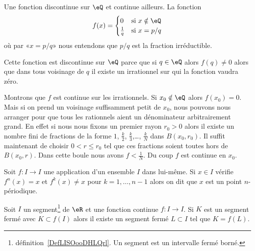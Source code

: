 \begin{example}
	Une fonction discontinue sur \( \eQ\) et continue ailleurs. La fonction
	\begin{equation}
		f(x)=\begin{cases}
			0             & \text{si } x\notin \eQ \\
			\frac{1}{ q } & \text{si } x=p/q
		\end{cases}
	\end{equation}
	où par «\( x=p/q\)» nous entendons que \( p/q\) est la fraction irréductible.

	Cette fonction est discontinue sur \( \eQ\) parce que si \( q\in \eQ\) alors \( f(q)\neq 0\) alors que dans tous voisinage de \( q\) il existe un irrationnel sur qui la fonction vaudra zéro.

	Montrons que \( f\) est continue sur les irrationnels. Si \( x_0\notin \eQ\) alors \( f(x_0)=0\). Mais si on prend un voisinage suffisamment petit de \( x_0\), nous pouvons nous arranger pour que tous les rationnels aient un dénominateur arbitrairement grand. En effet si nous nous fixons un premier rayon \( r_0>0\) alors il existe un nombre fini de fractions de la forme \( 1\), \( \frac{ k }{2}\), \( \frac{ k }{ 3 }\),\ldots, \( \frac{ k }{ N }\) dans \( B(x_0,r_0)\). Il suffit maintenant de choisir \( 0<r\leq r_0\) tel que ces fractions soient toutes hors de \( B(x_0,r)\). Dans cette boule nous avons \( f<\frac{1}{ N }\). Du coup \( f\) est continue en \( x_0\).
\end{example}

\begin{definition}
	Soit \( f\colon I\to I\) une application d'un ensemble \( I\) dans lui-même. Si \( x\in I\) vérifie \( f^n(x)=x\) et \( f^k(x)\neq x\) pour \( k=1,\ldots, n-1\) alors on dit que \( x\) est un point \( n\)-périodique.
\end{definition}

\begin{lemma}       \label{LemAONBooGZBuYt}
	Soit \( I\) un segment\footnote{définition~\ref{DefLISOooDHLQrl}. Un segment est un intervalle fermé borné.} de \( \eR\) et une fonction continue \( f\colon I\to I\). Si \( K\) est un segment fermé avec \( K\subset f(I)\) alors il existe un segment fermé \( L\subset I\) tel que \( K=f(L)\).
\end{lemma}

